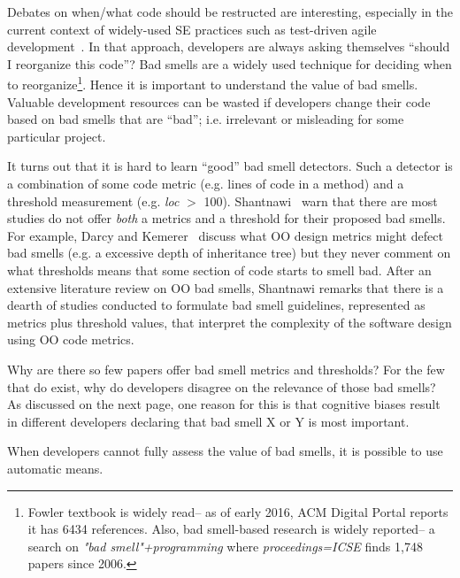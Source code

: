 \documentclass{sig-alternate}
\begin{document}
Debates on when/what code should be restructed are interesting, especially
in the current context of  widely-used SE practices such as
test-driven agile development~\cite{beck2003test,janzen05,williams2003test,george2003initial}.
In that approach, developers are always asking themselves ``should I reorganize this code''?
Bad smells are a widely used  technique for deciding when to reorganize\footnote{Fowler textbook is widely read-- as of  early 2016, ACM Digital Portal reports 
it has 6434 references. Also, bad smell-based research
is widely reported-- a search  on {\em "bad smell"+programming} 
where {\em proceedings=ICSE} finds 1,748 papers since 2006.}.
Hence it is important to understand the value of
 bad smells.  
Valuable development resources can be wasted if developers
change their code based on   bad smells that are ``bad''; i.e. 
 irrelevant or misleading
for some particular project.
 

It turns out that it is hard to learn ``good'' bad smell detectors. Such a detector
is a combination of some code metric (e.g. lines of code in a method)
and a threshold measurement (e.g. {\em loc} $>$ 100). 
Shantnawi~\cite{Shatnawi10} warn that  there are most  studies do not offer
{\em both} a metrics and a threshold for their proposed bad smells. For example,  Darcy and Kemerer~\cite{darcy05}
discuss what OO design metrics might defect bad smells (e.g. a excessive
depth of inheritance tree) but they never comment on what thresholds
means that some section of code starts to smell bad. After
an extensive literature review on OO bad smells, Shantnawi remarks that there is a dearth
of  studies  conducted to formulate bad smell guidelines,
represented as metrics plus threshold values, that interpret the complexity of the software design using OO code metrics. 

Why are there so few papers offer bad smell metrics and thresholds? For the few that
do exist, why do developers disagree on the relevance of those bad smells?
As discussed on the next page, one reason for this is that 
   cognitive biases result in different
developers declaring that
bad smell X or Y is most important. 

When developers cannot fully assess the value of bad smells,
it is possible to use automatic means. 
\end{document}
